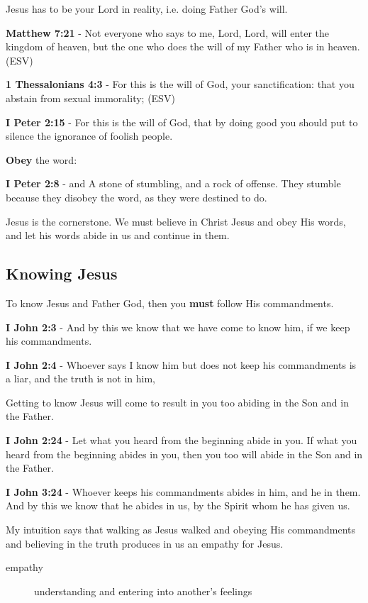 \documentclass[11pt]{article}
\begin{document}
Jesus has to be your Lord in reality, i.e. doing Father God's will.

\textbf{Matthew 7:21} - Not everyone who says to me, Lord, Lord, will enter the kingdom of heaven, but the one who does the will of my Father who is in heaven. (ESV)

\textbf{1 Thessalonians 4:3} - For this is the will of God, your sanctification: that you abstain from sexual immorality; (ESV)

\textbf{I Peter 2:15} - For this is the will of God, that by doing good you should put to silence the ignorance of foolish people.

\textbf{Obey} the word:

\textbf{I Peter 2:8} - and A stone of stumbling, and a rock of offense. They stumble because they disobey the word, as they were destined to do.

Jesus is the cornerstone. We must believe in Christ Jesus and obey His words, and let his words abide in us and continue in them.

\subsection{Knowing Jesus}
\label{sec:org2f7efe9}
To know Jesus and Father God, then you \textbf{must} follow His commandments.

\textbf{I John 2:3} - And by this we know that we have come to know him, if we keep his commandments.

\textbf{I John 2:4} - Whoever says I know him but does not keep his commandments is a liar, and the truth is not in him,

Getting to know Jesus will come to result in you too abiding in the Son and in the Father.

\textbf{I John 2:24} - Let what you heard from the beginning abide in you. If what you heard from the beginning abides in you, then you too will abide in the Son and in the Father.

\textbf{I John 3:24} - Whoever keeps his commandments abides in him, and he in them. And by this we know that he abides in us, by the Spirit whom he has given us.

My intuition says that walking as Jesus walked and obeying His commandments and believing in the truth produces in us an empathy for Jesus.

\begin{description}
\item[{empathy}] understanding and entering into another's feelings
\end{description}
\end{document}

